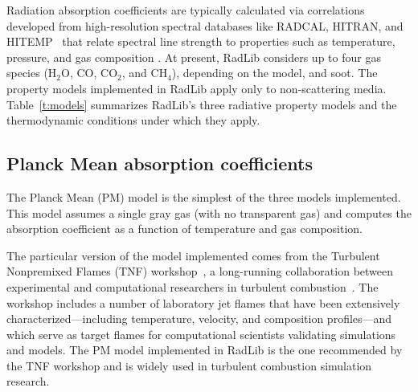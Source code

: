\documentclass[preprint,12pt]{elsarticle}
\begin{document}
    Radiation absorption coefficients are typically calculated via correlations developed from high-resolution
    spectral databases like RADCAL, HITRAN, and HITEMP~\citep{Grosshandler_1993,Rothman_2010} that relate spectral line strength to properties such as temperature, pressure, and gas composition \citep{Zhang_2002b}. At present, RadLib considers up to four gas species (H$_2$O, CO, CO$_2$, and CH$_4$), depending on the model, and soot. The property models implemented in RadLib apply only to non-scattering media.
    Table~\ref{t:models} summarizes RadLib's three radiative property models and the thermodynamic conditions under
    which they apply.

    \begin{table}
        \caption{Summary of radiative property models in RadLib and the range of conditions under which they can be
        applied.}
        \label{t:models}
        \centering
    \end{table}


    \subsection{Planck Mean absorption coefficients} \label{s:planckmean}

    The Planck Mean (PM) model is the simplest of the three models implemented. This model assumes a single gray gas
    (with no transparent gas)
    and computes the absorption coefficient as a function of temperature and gas composition.

    The particular version of the model implemented comes from the Turbulent Nonpremixed Flames (TNF)
    workshop~\cite{TNF}, a long-running collaboration between experimental and computational researchers in turbulent
    combustion~\citep{Smith_2003,Barlow_2001}. The workshop includes a number of laboratory jet flames that have been
    extensively characterized---including temperature, velocity, and composition profiles---and which serve as target
    flames for computational scientists validating simulations and models. The PM model implemented in RadLib is the
    one recommended by the TNF workshop and is widely used in turbulent combustion simulation research.
\end{document}
